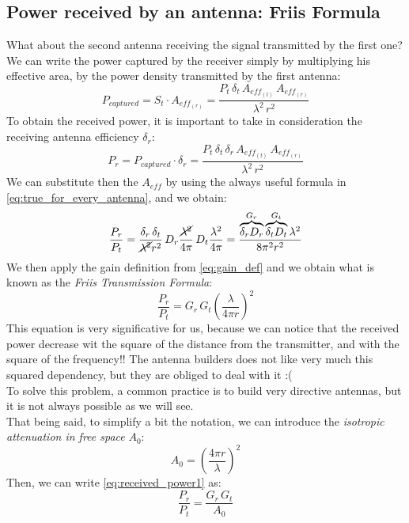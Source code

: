 \subsection*{Power received by an antenna: Friis Formula}
What about the second antenna receiving the signal transmitted by the first one? We can write the power captured by the receiver simply by multiplying his effective area, by the power density transmitted by the first antenna:
\begin{equation}\label{eq:pow_captured}
    P_{captured}=S_t\cdot A_{eff_{(r)}}=\frac{P_t\,\delta_t\,A_{eff_{(t)}}\,A_{eff_{(r)}}}{\lambda^2\,r^2}
\end{equation}
To obtain the received power, it is important to take in consideration the receiving antenna efficiency $\delta_r$:
\begin{equation}
    P_r=P_{captured}\cdot \delta_r=\frac{P_t\,\delta_t\,\delta_r\,A_{eff_{(t)}}\,A_{eff_{(r)}}}{\lambda^2\,r^2}
\end{equation}
We can substitute then the $A_{eff}$ by using the always useful formula in \cref{eq:true_for_every_antenna}, and we obtain:
\begin{equation}
    \frac{P_r}{P_t}=\frac{\delta_r\,\delta_t}{\cancel{\lambda^2}r^2}\,D_r\frac{\cancel{\lambda^2}}{4\pi}\,D_t\frac{\lambda^2}{4\pi}=\frac{\overbrace{\delta_rD_r}^{G_r}\overbrace{\delta_tD_t}^{G_t}\lambda^2}{8\pi^2r^2}
\end{equation}
We then apply the gain definition from \cref{eq:gain_def} and we obtain what is known as the \emph{Friis Transmission Formula}:
\begin{equation}\label{eq:received_power1}
    \frac{P_r}{P_t}=G_r\,G_t\left(\frac{\lambda}{4\pi r}\right)^2
\end{equation}
This equation is very significative for us, because we can notice that the received power decrease wit the square of the distance from the transmitter, and with the square of the frequency!! The antenna builders does not like very much this squared dependency, but they are obliged to deal with it :(\\
To solve this problem, a common practice is to build very directive antennas, but it is not always possible as we will see.\\
That being said, to simplify a bit the notation, we can introduce the \emph{isotropic attenuation in free space} $A_0$:
\begin{equation}\label{eq:isotropic_attenuation}
    A_0=\left(\frac{4\pi r}{\lambda}\right)^2
\end{equation}
Then, we can write \cref{eq:received_power1} as:
\begin{equation}\label{eq:received_power2}
    \frac{P_r}{P_t}=\frac{G_r\,G_t}{A_0}
\end{equation}
